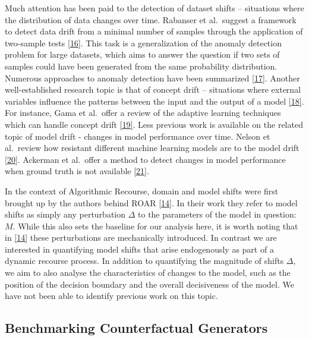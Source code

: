 \documentclass[
  conference]{IEEEtran}
\begin{document}
Much attention has been paid to the detection of dataset shifts --
situations where the distribution of data changes over time. Rabanser et
al.~suggest a framework to detect data drift from a minimal number of
samples through the application of two-sample tests
\protect\hyperlink{ref-rabanser2019failing}{{[}16{]}}. This task is a
generalization of the anomaly detection problem for large datasets,
which aims to answer the question if two sets of samples could have been
generated from the same probability distribution. Numerous approaches to
anomaly detection have been summarized
\protect\hyperlink{ref-chandola2009anomaly}{{[}17{]}}. Another
well-established research topic is that of concept drift -- situations
where external variables influence the patterns between the input and
the output of a model
\protect\hyperlink{ref-widmer1996learning}{{[}18{]}}. For instance, Gama
et al.~offer a review of the adaptive learning techniques which can
handle concept drift \protect\hyperlink{ref-gama2014survey}{{[}19{]}}.
Less previous work is available on the related topic of model drift -
changes in model performance over time. Nelson et al.~review how
resistant different machine learning models are to the model drift
\protect\hyperlink{ref-nelson2015evaluating}{{[}20{]}}. Ackerman et
al.~offer a method to detect changes in model performance when ground
truth is not available
\protect\hyperlink{ref-ackerman2021machine}{{[}21{]}}.

In the context of Algorithmic Recourse, domain and model shifts were
first brought up by the authors behind ROAR
\protect\hyperlink{ref-upadhyay2021towards}{{[}14{]}}. In their work
they refer to model shifts as simply any perturbation \(\Delta\) to the
parameters of the model in question: \(M\). While this also sets the
baseline for our analysis here, it is worth noting that in
\protect\hyperlink{ref-upadhyay2021towards}{{[}14{]}} these
perturbations are mechanically introduced. In contrast we are interested
in quantifying model shifts that arise endogenously as part of a dynamic
recourse process. In addition to quantifying the magnitude of shifts
\(\Delta\), we aim to also analyse the characteristics of changes to the
model, such as the position of the decision boundary and the overall
decisiveness of the model. We have not been able to identify previous
work on this topic.

\hypertarget{sec-related-benchmark}{%
\subsection{Benchmarking Counterfactual
Generators}\label{sec-related-benchmark}}
\end{document}
